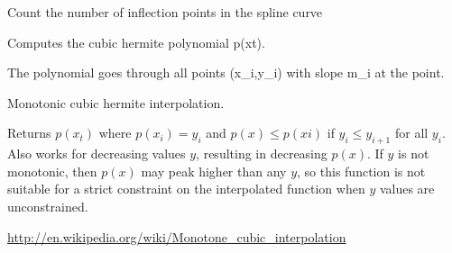 \documentclass[letterpaper,10pt,english]{sphinxmanual}
\begin{document}

\begin{fulllineitems}
\label{api/mono:refl1d.mono.count_inflections}
Count the number of inflection points in the spline curve

\end{fulllineitems}


\begin{fulllineitems}
\label{api/mono:refl1d.mono.hermite}
Computes the cubic hermite polynomial p(xt).

The polynomial goes through all points (x\_i,y\_i) with slope
m\_i at the point.

\end{fulllineitems}


\begin{fulllineitems}
\label{api/mono:refl1d.mono.inflections}
\end{fulllineitems}


\begin{fulllineitems}
\label{api/mono:refl1d.mono.monospline}
Monotonic cubic hermite interpolation.

Returns $p(x_t)$ where $p(x_i)= y_i$ and $p(x) \leq p(xi)$
if $y_i \leq y_{i+1}$ for all $y_i$.  Also works for decreasing
values $y$, resulting in decreasing $p(x)$.  If $y$ is not monotonic,
then $p(x)$ may peak higher than any $y$, so this function is not
suitable for a strict constraint on the interpolated function when
$y$ values are unconstrained.

\href{http://en.wikipedia.org/wiki/Monotone\_cubic\_interpolation}{http://en.wikipedia.org/wiki/Monotone\_cubic\_interpolation}

\end{fulllineitems}

\end{document}
